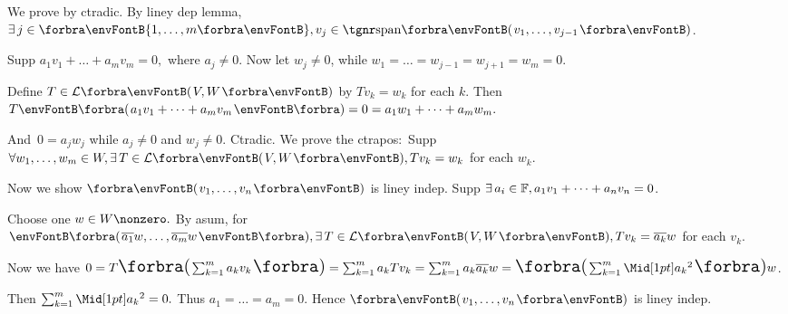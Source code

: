 \par\quad
We prove by ctradic. By liney dep lemma, $\exists\,j\in\Bra{1,\dots,m},v_j\in\Span{v_1,\dots,v_{j-1}}$.\par\quad
Supp $a_1 v_1+\dots+a_m v_m=0,$ where $a_j\neq 0.$ \;Now let $w_j\neq 0$, while $w_1=\dots=w_{j-1}=w_{j+1}=w_m=0.$\par\quad
Define $T\in\Lm{V,W}$ by $Tv_k=w_k$ for each $k.$ Then $T\BigPar{a_1 v_1+\dots+a_m v_m}=0=a_1 w_1+\dots+a_m w_m.$\par\quad
And \,$0=a_j w_j$ while $a_j\neq 0$ and $w_j\neq 0.$ Ctradic.\PfEnd\vspace{6pt}\quad
\Or We prove the ctrapos\hspace{1pt}: \,Supp $\forall w_1,\dots,w_m\in W,\exists\,T\in\Lm{V,W},Tv_k=w_k$  for each $w_k.$\par\quad
{Now we show $\Par{v_1,\dots,v_n}$ is liney indep. Supp {$\exists\,a_i\in{\mathbb{F}},a_1 v_1+\dots+a_n v_n=0$}.}\vspace{2pt}\par\quad
{Choose one $w\in W\nonzero.$ By asum, for {$\BigPar{\overline{a_1}w,\dots,\overline{a_m}w},\exists\,T\in\Lm{V,W},Tv_k=\overline{a_k}w$} for each $v_k$.}\vspace{2pt}\par\quad
{Now we have {$ 0=T\envFontLarge\BigPar{{\envFontDefault\sum_{k=1}^m a_k v_k}}=\sum_{k=1}^m a_k Tv_k=\sum_{k=1}^m a_k\overline{a_k}w=\BigPar{{\envFontDefault\sum_{k=1}^m \aMid{a_k}{^2}}}w$}.}\vspace{2pt}\par\quad
{Then {$\sum_{k=1}^m\aMid{a_k}{^2}=0.$ Thus $a_1=\dots=a_m=0.$} Hence $\Par{v_1,\dots,v_n}$ is liney indep.}\PfEnd
\SepLine

